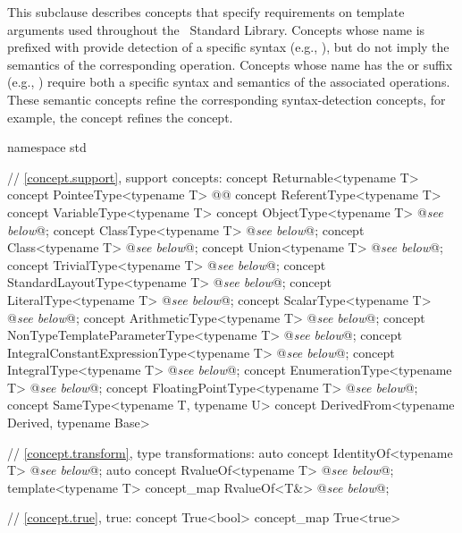 \documentclass[american,twoside]{book}
\begin{document}
\pnum
This subclause describes concepts that specify requirements on
template arguments used throughout the \Cpp\ Standard
Library. Concepts whose name is prefixed with  provide
detection of a specific syntax (e.g., ), but do
not imply the semantics of the corresponding operation. Concepts whose
name has the  or  suffix (e.g.,
) require both a specific syntax and semantics of
the associated operations. These semantic concepts refine the
corresponding syntax-detection concepts, for example, the
 concept refines the 
concept.

\begin{codeblock}
namespace std {
  // \ref{concept.support}, support concepts:
  concept Returnable<typename T> { }
  concept PointeeType<typename T> { }
  @@
  concept ReferentType<typename T> { }
  concept VariableType<typename T> { }
  concept ObjectType<typename T> @\textit{see below}@;
  concept ClassType<typename T> @\textit{see below}@;
  concept Class<typename T> @\textit{see below}@;
  concept Union<typename T> @\textit{see below}@;
  concept TrivialType<typename T> @\textit{see below}@;
  concept StandardLayoutType<typename T> @\textit{see below}@;
  concept LiteralType<typename T> @\textit{see below}@;
  concept ScalarType<typename T> @\textit{see below}@;
  concept ArithmeticType<typename T> @\textit{see below}@;
  concept NonTypeTemplateParameterType<typename T> @\textit{see below}@;
  concept IntegralConstantExpressionType<typename T> @\textit{see below}@;
  concept IntegralType<typename T> @\textit{see below}@;
  concept EnumerationType<typename T> @\textit{see below}@;
  concept FloatingPointType<typename T> @\textit{see below}@;
  concept SameType<typename T, typename U> {  }
  concept DerivedFrom<typename Derived, typename Base> { }

  // \ref{concept.transform}, type transformations:
  auto concept IdentityOf<typename T> @\textit{see below}@;
  auto concept RvalueOf<typename T> @\textit{see below}@;
  template<typename T> concept_map RvalueOf<T&> @\textit{see below}@;

  // \ref{concept.true}, true:
  concept True<bool> { }
  concept_map True<true> { }

}
\end{codeblock}
\end{document}
